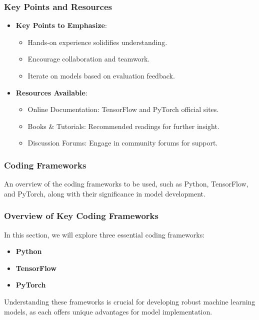 \documentclass[aspectratio=169]{beamer}
\begin{document}
\begin{frame}
    \frametitle{Key Points and Resources}
    \begin{itemize}
        \item \textbf{Key Points to Emphasize}:
            \begin{itemize}
                \item Hands-on experience solidifies understanding.
                \item Encourage collaboration and teamwork.
                \item Iterate on models based on evaluation feedback.
            \end{itemize}
        \item \textbf{Resources Available}:
            \begin{itemize}
                \item Online Documentation: TensorFlow and PyTorch official sites.
                \item Books \& Tutorials: Recommended readings for further insight.
                \item Discussion Forums: Engage in community forums for support.
            \end{itemize}
    \end{itemize}
\end{frame}

\begin{frame}
    \frametitle{Coding Frameworks}
    An overview of the coding frameworks to be used, such as Python, TensorFlow, and PyTorch, along with their significance in model development.
\end{frame}

\begin{frame}
    \frametitle{Overview of Key Coding Frameworks}
    In this section, we will explore three essential coding frameworks: 
    \begin{itemize}
        \item \textbf{Python}
        \item \textbf{TensorFlow}
        \item \textbf{PyTorch}
    \end{itemize}
    
    Understanding these frameworks is crucial for developing robust machine learning models, as each offers unique advantages for model implementation.
\end{frame}
\end{document}
